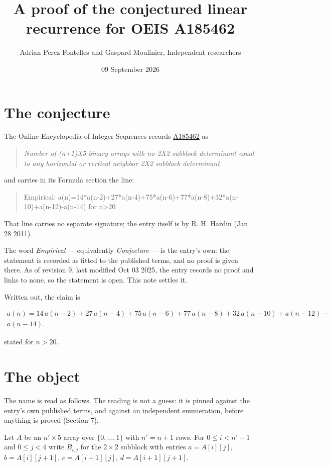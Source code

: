 \documentclass[11pt]{article}
\title{A proof of the conjectured linear recurrence for OEIS A185462}
\author{Adrian Perez Fontelles and Gaspard Moulinier, Independent researchers}
\date{09 September 2026}
\theoremstyle{definition}
\begin{document}
\maketitle
\section{The conjecture}

The Online Encyclopedia of Integer Sequences records \href{https://oeis.org/A185462}{A185462} as

\begin{quote}\itshape Number of (n+1)X5 binary arrays with no 2X2 subblock determinant equal to any horizontal or vertical neighbor 2X2 subblock determinant\end{quote}

and carries in its Formula section the line:

\begin{quote}\ttfamily Empirical: a(n)=14*a(n-2)+27*a(n-4)+75*a(n-6)+77*a(n-8)+32*a(n-10)+a(n-12)-a(n-14) for n>20\end{quote}

That line carries no separate signature; the entry itself is by R. H. Hardin (Jan 28 2011).

The word {\itshape Empirical} --- equivalently {\itshape Conjecture} --- is the entry's own: the statement is recorded as fitted to the published terms, and no proof is given there. As of revision 9, last modified Oct 03 2025, the entry records no proof and links to none, so the statement is open. This note settles it.

Written out, the claim is

\begin{multline*} a(n) = 14\,a(n-2) + 27\,a(n-4) + 75\,a(n-6) + 77\,a(n-8) + 32\,a(n-10) + a(n-12) - \\ a(n-14). \end{multline*}

stated for $n > 20$.

\section{The object}

The name is read as follows. The reading is not a guess: it is pinned against the entry's own published terms, and against an independent enumeration, before anything is proved (Section 7).

Let $A$ be an $n' \times 5$ array over $\{0,\dots,1\}$ with $n' = n + 1$ rows. For $0 \le i < n'-1$ and $0 \le j < 4$ write $B_{i,j}$ for the $2\times2$ subblock with entries $a = A[i][j]$, $b = A[i][j{+}1]$, $c = A[i{+}1][j]$, $d = A[i{+}1][j{+}1]$.
\end{document}
